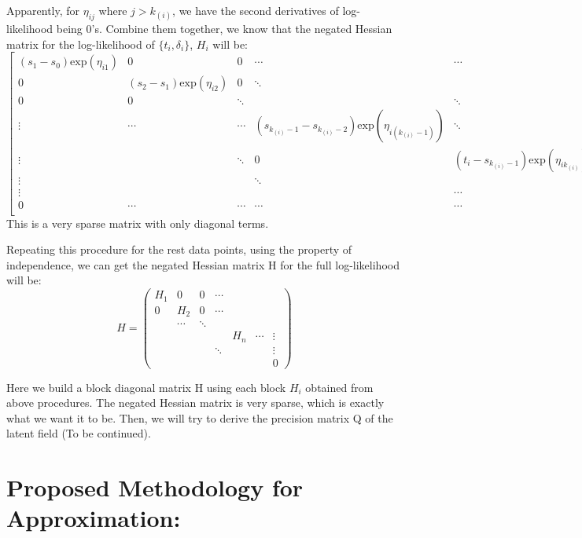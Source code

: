 \documentclass[]{article}
\begin{document}
Apparently, for \(\eta_{ij}\) where \(j>k_{(i)}\), we have the second
derivatives of log-likelihood being 0's. Combine them together, we know
that the negated Hessian matrix for the log-likelihood of
\(\{t_i,\delta_i\}\), \(H_i\) will be: \begin{equation}
\begin{bmatrix}
(s_1-s_0)\text{exp}(\eta_{i1})  & 0  & 0 & \cdots & \cdots & \cdots & 0 \\
0  & (s_2-s_1)\text{exp}(\eta_{i2})  & 0  & \ddots & && &  \\
0 & 0  & \ddots &   & \ddots & &  &  \\
\vdots & \cdots & \cdots & (s_{k_{(i)}-1}-s_{k_{(i)}-2})\text{exp}(\eta_{i(k_{(i)}-1)}) & \ddots & \vdots &  &  \\
\vdots & & \ddots & 0 & (t_i-s_{k_{(i)}-1})\text{exp}(\eta_{ik_{(i)}}) & \cdots & \vdots& \\
\vdots  & & & \ddots &   & \ddots  &  \vdots\\
\vdots  & && & \cdots & \cdots & \vdots\\
0 & \cdots &  \cdots & \cdots & \cdots & \cdots & 0\\
\end{bmatrix}
\end{equation} This is a very sparse matrix with only diagonal terms.

Repeating this procedure for the rest data points, using the property of
independence, we can get the negated Hessian matrix H for the full
log-likelihood will be: \begin{equation}
H = \begin{pmatrix} 
H_1 & 0 & 0 & \cdots & & \\ 
0 & H_2 & 0 & \cdots & & \\
  & \cdots & \ddots &  & & \\
& & & & H_n & \cdots & \vdots \\ 
& & & \ddots & &&\vdots \\
& & & & & & 0
\end{pmatrix}
\end{equation}

Here we build a block diagonal matrix H using each block \(H_i\)
obtained from above procedures. The negated Hessian matrix is very
sparse, which is exactly what we want it to be. Then, we will try to
derive the precision matrix Q of the latent field (To be continued).

\hypertarget{proposed-methodology-for-approximation}{%
\section{Proposed Methodology for
Approximation:}\label{proposed-methodology-for-approximation}}
\end{document}
